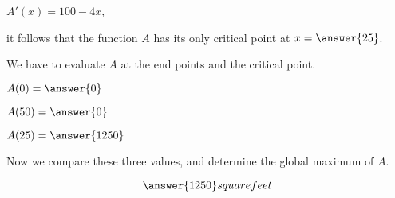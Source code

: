 \documentclass{ximera}
\begin{document}
\begin{exercise}
\begin{hint}
$A'(x)=100-4x$,

it follows that  the function $A$ has its only critical point at $x=\answer{25}$.

\end{hint}
\begin{hint}
We have to evaluate $A$ at the end points and the critical point.

$A(0)=\answer{0}$

$A(50)=\answer{0}$

$A(25)=\answer{1250}$

Now we compare these three values, and determine the global maximum of $A$.
\end{hint}
  \begin{prompt}
  \[
  \answer{1250} square feet
  \]
  \end{prompt}
\end{exercise}
\end{document}
